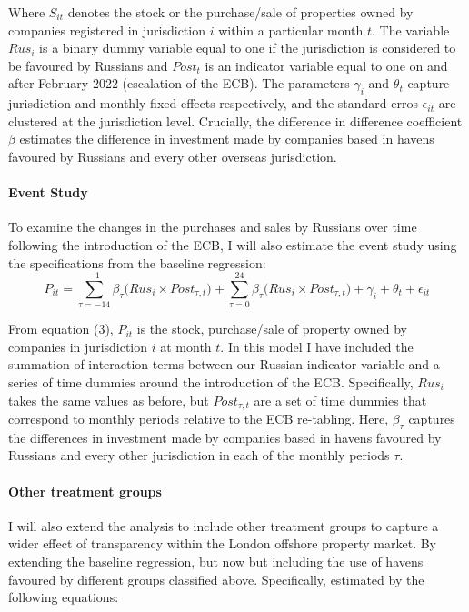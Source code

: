 \documentclass{article}
\begin{document}
Where $S_{it}$ denotes the stock or the purchase/sale of properties owned by companies registered in jurisdiction $i$ within a particular month $t$. The variable $Rus_i$ is a binary dummy variable equal to one if the jurisdiction is considered to be favoured by Russians and $Post_t$ is an indicator variable equal to one on and after February 2022 (escalation of the ECB). The parameters $\gamma_i$ and $\theta_t$ capture jurisdiction and monthly fixed effects respectively, and the standard erros $\epsilon_{it}$ are clustered at the jurisdiction level. Crucially, the difference in difference coefficient $\beta$ estimates the difference in investment made by companies based in havens favoured by Russians and every other overseas jurisdiction. 

\paragraph{Event Study}To examine the changes in the purchases and sales by Russians over time following the introduction of the ECB, I will also estimate the event study using the specifications from the baseline regression: 
\begin{equation}
P_{it} = \sum^{-1}_{\tau=-14}\beta_\tau({Rus_{i}\times{Post_{\tau,t}})}+\sum^{24}_{\tau=0}\beta_\tau({Rus_{i}}\times{Post_{\tau,t})} + \gamma_i + \theta_t + \epsilon_{it}
\end{equation}

From equation (3), $P_{it}$ is the stock, purchase/sale of property owned by companies in jurisdiction $i$ at month $t$. In this model I have included the summation of interaction terms between our Russian indicator variable and a series of time dummies around the introduction of the ECB. Specifically, $Rus_i$ takes the same values as before, but $Post_{\tau,t}$ are a set of time dummies that correspond to monthly periods relative to the ECB re-tabling. Here, $\beta_\tau$ captures the differences in investment made by companies based in havens favoured by Russians and every other jurisdiction in each of the monthly periods $\tau$.  

\paragraph{Other treatment groups} I will also extend the analysis to include other treatment groups to capture a wider effect of transparency within the London offshore property market. By extending the baseline regression, but now but including the use of havens favoured by different groups classified above. Specifically, estimated by the following equations: 
\end{document}
